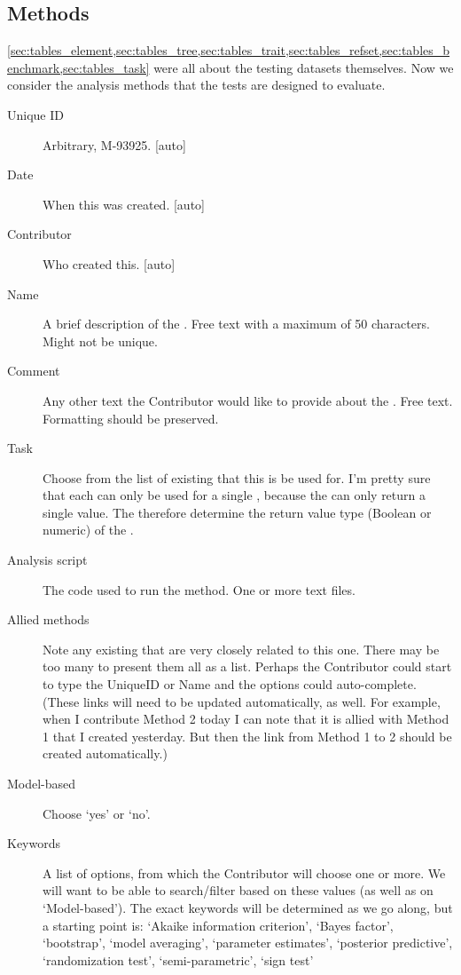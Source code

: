 \subsection{Methods}
\label{sec:tables_method}

\cref{sec:tables_element,sec:tables_tree,sec:tables_trait,sec:tables_refset,sec:tables_benchmark,sec:tables_task} were all about the testing datasets themselves.
Now we consider the analysis methods that the tests are designed to evaluate.

\begin{description}
    \item[Unique ID] Arbitrary, \eg M-93925. [auto]
    \item[Date] When this was created. [auto]
    \item[Contributor] Who created this. [auto]
    \item[Name] A brief description of the \Method.
            Free text with a maximum of 50 characters.  Might not be unique.
    \item[Comment] Any other text the Contributor would like to provide about the \Method.
            Free text.  Formatting should be preserved.
    \item[Task] Choose from the list of existing \Tasks that this \Method is be used for.
            I'm pretty sure that each \Method can only be used for a single \Task, because the \Method can only return a single value.
            The \Task therefore determine the return value type (Boolean or numeric) of the \Method.
    \item[Analysis script] The code used to run the method.  One or more text files.
    \item[Allied methods] Note any existing \Methods that are very closely related to this one.
            There may be too many \Methods to present them all as a list.  Perhaps the Contributor could start to type the UniqueID or Name and the options could auto-complete.
            (These links will need to be updated automatically, as well.  For example, when I contribute Method 2 today I can note that it is allied with Method 1 that I created yesterday.  But then the link from Method 1 to 2 should be created automatically.)
    \item[Model-based] Choose `yes' or `no'.
    \item[Keywords] A list of options, from which the Contributor will choose one or more.
            We will want to be able to search/filter \Methods based on these values (as well as on `Model-based').
            The exact keywords will be determined as we go along, but a starting point is:
                `Akaike information criterion',
                `Bayes factor',
                `bootstrap',
                `model averaging',
                `parameter estimates',
                `posterior predictive',
                `randomization test',
                `semi-parametric',
                `sign test'
\end{description}

